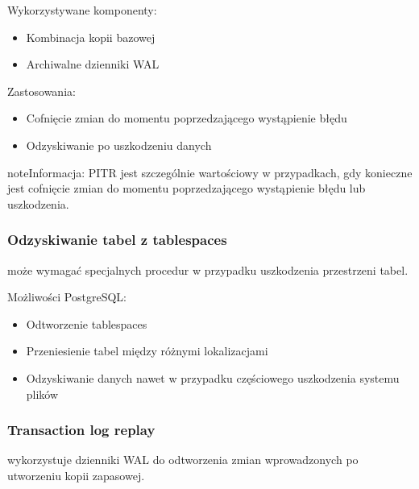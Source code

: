 \documentclass[letterpaper,10pt,polish]{sphinxmanual}
\begin{document}
\sphinxAtStartPar
Wykorzystywane komponenty:
\begin{itemize}
\item {} 
\sphinxAtStartPar
Kombinacja kopii bazowej

\item {} 
\sphinxAtStartPar
Archiwalne dzienniki WAL

\end{itemize}

\sphinxAtStartPar
Zastosowania:
\begin{itemize}
\item {} 
\sphinxAtStartPar
Cofnięcie zmian do momentu poprzedzającego wystąpienie błędu

\item {} 
\sphinxAtStartPar
Odzyskiwanie po uszkodzeniu danych

\end{itemize}

\begin{sphinxadmonition}{note}{Informacja:}
\sphinxAtStartPar
PITR jest szczególnie wartościowy w przypadkach, gdy konieczne jest cofnięcie zmian do momentu poprzedzającego wystąpienie błędu lub uszkodzenia.
\end{sphinxadmonition}


\subsubsection{Odzyskiwanie tabel z tablespaces}
\label{\detokenize{rozdzial2/Kopie_zapasowe_i_odzyskiwanie_danych/kopie_zapasowe_i_odzyskiwanie_danych:odzyskiwanie-tabel-z-tablespaces}}
\sphinxAtStartPar
{} może wymagać specjalnych procedur w przypadku uszkodzenia przestrzeni tabel.

\sphinxAtStartPar
Możliwości PostgreSQL:
\begin{itemize}
\item {} 
\sphinxAtStartPar
Odtworzenie tablespaces

\item {} 
\sphinxAtStartPar
Przeniesienie tabel między różnymi lokalizacjami

\item {} 
\sphinxAtStartPar
Odzyskiwanie danych nawet w przypadku częściowego uszkodzenia systemu plików

\end{itemize}


\subsubsection{Transaction log replay}
\label{\detokenize{rozdzial2/Kopie_zapasowe_i_odzyskiwanie_danych/kopie_zapasowe_i_odzyskiwanie_danych:transaction-log-replay}}
\sphinxAtStartPar
{} wykorzystuje dzienniki WAL do odtworzenia zmian wprowadzonych po utworzeniu kopii zapasowej.
\end{document}
